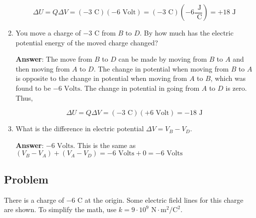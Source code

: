 \documentclass{article}
\begin{document}
\begin{enumerate}
          \begin{equation}
         \Delta U = Q\Delta V=(-3\text{ C})(-6\text{ Volt})=(-3\text{ C})\left(-6\frac{\text{ J}}{ \text{ C}}\right)=+18\text{ J}
        \end{equation}
        \fi

  \item You move a charge of $-3\text{ C}$ from $B$ to $D$. By how much has the electric potential energy of the moved charge changed?

        \ifsolutions
          \textbf{Answer}: The move from $B$ to $D$ can be made by moving from $B$ to $A$ and then moving from $A$ to $D$. The change in potential when moving from $B$ to $A$ is opposite to the change in potential when moving from $A$ to $B$, which was found to be $-6\text{ Volts}$. The change in potential in going from $A$ to $D$ is zero. Thus,
        
          \begin{equation}
         \Delta U = Q\Delta V=(-3\text{ C})(+6\text{ Volt})=-18\text{ J}
        \end{equation}
        \fi

  \item What is the difference in electric potential $\Delta V = V_B-V_D$.

        \ifsolutions
          \textbf{Answer}: $-6\text{ Volts}$. This is the same as $(V_B - V_A) + (V_A - V_D) = -6\text{ Volts} + 0 = -6\text{ Volts}$
        \fi

\end{enumerate}

\subsection{Problem}



There is a charge of $-6\text{ C}$ at the origin. Some electric field lines for this charge are shown. To simplify the math, use $k=9\cdot 10^9\text{ N}\cdot\text{m}^2/\text{C}^2$.
\end{document}
